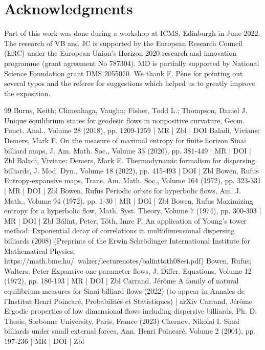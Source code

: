 \documentclass[10pt]{amsart}
\theoremstyle{definition}\newtheorem{defi}[theo]{Definition}\newtheorem{rema}[theo]{Remark}\newtheorem{exam}[theo]{Example}\newtheorem{exem}[theo]{Example}\newtheorem{nota}[theo]{Notation}
\begin{document}
\section*{Acknowledgments}

Part of this work was done during a workshop at ICMS, Edinburgh in June 2022. The research of VB and JC is supported by the European Research Council (ERC) under the European Union's Horizon 2020 research and innovation programme (grant agreement No 787304). MD is partially supported by National Science Foundation grant DMS 2055070. We thank F. Pène for pointing out several typos and the referee for suggestions which helped us to greatly improve the exposition.


\begin{thebibliography}{99}
Burns, Keith; Climenhaga, Vaughn; Fisher, Todd L.; Thompson, Daniel J. Unique equilibrium states for geodesic flows in nonpositive curvature, Geom. Funct. Anal., Volume 28 (2018), pp. 1209-1259 | MR | Zbl | DOI
Baladi, Viviane; Demers, Mark F. On the measure of maximal entropy for finite horizon Sinai billiard maps, J. Am. Math. Soc., Volume 33 (2020), pp. 381-449 | MR | DOI | Zbl
Baladi, Viviane; Demers, Mark F. Thermodynamic formalism for dispersing billiards, J. Mod. Dyn., Volume 18 (2022), pp. 415-493 | DOI | Zbl
Bowen, Rufus Entropy-expansive maps, Trans. Am. Math. Soc., Volume 164 (1972), pp. 323-331 | MR | DOI | Zbl
Bowen, Rufus Periodic orbits for hyperbolic flows, Am. J. Math., Volume 94 (1972), pp. 1-30 | MR | DOI | Zbl
Bowen, Rufus Maximizing entropy for a hyperbolic flow, Math. Syst. Theory, Volume 7 (1974), pp. 300-303 | MR | DOI | Zbl
Bálint, Peter; Tóth, Imre P. An application of Young’s tower method: Exponential decay of correlations in multidimensional dispersing billiards (2008) (Preprints of the Erwin Schrödinger International Institute for Mathematical Physics, https://math.bme.hu/~walzer/lecturenotes/balinttoth08esi.pdf)
Bowen, Rufus; Walters, Peter Expansive one-parameter flows, J. Differ. Equations, Volume 12 (1972), pp. 180-193 | MR | DOI | Zbl
Carrand, Jérôme A family of natural equilibrium measures for Sinai billiard flows (2022) (to appear in Annales de l’Institut Henri Poincaré, Probabilités et Statistiques) | arXiv
Carrand, Jérôme Ergodic properties of low dimensional flows including dispersive billiards, Ph. D. Thesis, Sorbonne University, Paris, France (2023)
Chernov, Nikolai I. Sinai billiards under small external forces, Ann. Henri Poincaré, Volume 2 (2001), pp. 197-236 | MR | DOI | Zbl

\end{thebibliography}
\end{document}

